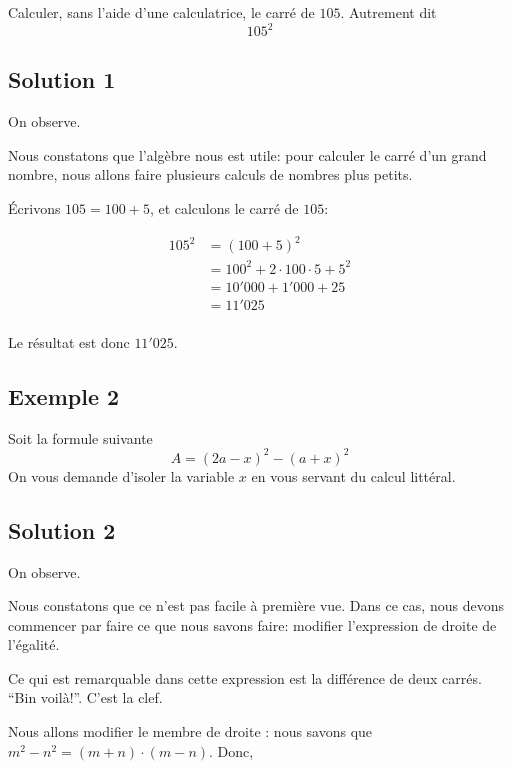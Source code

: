 \documentclass[
  12pt,
]{book}
\begin{document}
Calculer, sans l'aide d'une calculatrice, le carré de \(105\). Autrement dit \[105^2\]

\hypertarget{solution-1-2}{%
\subsection*{Solution 1}\label{solution-1-2}}

On observe.

Nous constatons que l'algèbre nous est utile: pour calculer le carré d'un grand nombre, nous allons faire plusieurs calculs de nombres plus petits.

Écrivons \(105=100+5\), et calculons le carré de \(105\):

\begin{align*}
105^2 & = (100+5)^2\\
      & = 100^2 + 2\cdot 100\cdot 5 + 5^2\\
      & = 10'000 + 1'000 + 25\\
      & = 11'025\\
\end{align*}

Le résultat est donc \(11'025\).

\hypertarget{exemple-2-3}{%
\subsection{Exemple 2}\label{exemple-2-3}}

Soit la formule suivante \[A=(2a-x)^2-(a+x)^2\]
On vous demande d'isoler la variable \(x\) en vous servant du calcul littéral.

\hypertarget{solution-2-2}{%
\subsection*{Solution 2}\label{solution-2-2}}

On observe.

Nous constatons que ce n'est pas facile à première vue. Dans ce cas, nous devons commencer par faire ce que nous savons faire: modifier l'expression de droite de l'égalité.

Ce qui est remarquable dans cette expression est la différence de deux carrés. ``Bin voilà!''. C'est la clef.

Nous allons modifier le membre de droite : nous savons que \(m^2 - n^2=(m+n)\cdot(m-n)\). Donc,
\end{document}
